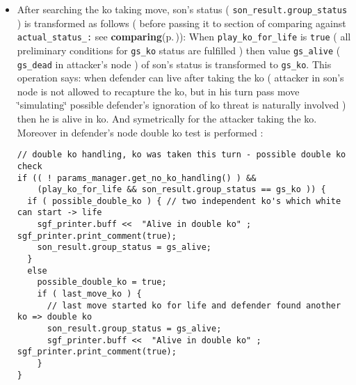 \begin{itemize}
\item After searching the ko taking move, son's status ( {\tt son\_\-result.group\_\-status} ) is transformed as follows ( before passing it to section of comparing against {\tt actual\_\-status\_\-:} see {\bf comparing}{\rm (p.\,\pageref{page_3_node_comparing})}): When {\tt play\_\-ko\_\-for\_\-life} is {\tt true} ( all preliminary conditions for {\tt gs\_\-ko} status are fulfilled ) then value {\tt gs\_\-alive} ( {\tt gs\_\-dead} in attacker's node ) of son's status is transformed to {\tt gs\_\-ko}. This operation says: when defender can live after taking the ko ( attacker in son's node is not allowed to recapture the ko, but in his turn pass move \char`\"{}simulating\char`\"{} possible defender's ignoration of ko threat is naturally involved ) then he is alive in ko. And symetrically for the attacker taking the ko. Moreover in defender's node double ko test is performed : 

\footnotesize\begin{verbatim}// double ko handling, ko was taken this turn - possible double ko check 
if (( ! params_manager.get_no_ko_handling() ) && 
    (play_ko_for_life && son_result.group_status == gs_ko )) { 
  if ( possible_double_ko ) { // two independent ko's which white can start -> life
    sgf_printer.buff <<  "Alive in double ko" ; sgf_printer.print_comment(true);
    son_result.group_status = gs_alive;
  }
  else 
    possible_double_ko = true;
    if ( last_move_ko ) { 
      // last move started ko for life and defender found another ko => double ko
      son_result.group_status = gs_alive;
      sgf_printer.buff <<  "Alive in double ko" ; sgf_printer.print_comment(true);
    }
}
\end{verbatim}
\normalsize
\end{itemize}


